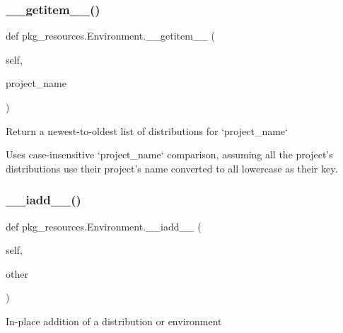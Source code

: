 \subsubsection{\texorpdfstring{\+\_\+\+\_\+getitem\+\_\+\+\_\+()}{\_\_getitem\_\_()}}
{\footnotesize\ttfamily def pkg\+\_\+resources.\+Environment.\+\_\+\+\_\+getitem\+\_\+\+\_\+ (\begin{DoxyParamCaption}\item[{}]{self,  }\item[{}]{project\+\_\+name }\end{DoxyParamCaption})}

\begin{DoxyVerb}Return a newest-to-oldest list of distributions for `project_name`

Uses case-insensitive `project_name` comparison, assuming all the
project's distributions use their project's name converted to all
lowercase as their key.\end{DoxyVerb}
 \mbox{\label{classpkg__resources_1_1_environment_ac8fc54442fe5e9c647b57320e7ccf78a}} 
\subsubsection{\texorpdfstring{\+\_\+\+\_\+iadd\+\_\+\+\_\+()}{\_\_iadd\_\_()}}
{\footnotesize\ttfamily def pkg\+\_\+resources.\+Environment.\+\_\+\+\_\+iadd\+\_\+\+\_\+ (\begin{DoxyParamCaption}\item[{}]{self,  }\item[{}]{other }\end{DoxyParamCaption})}

\begin{DoxyVerb}In-place addition of a distribution or environment\end{DoxyVerb}
 \mbox{\label{classpkg__resources_1_1_environment_a7f967904be209cefe39230614470ca3f}} 
